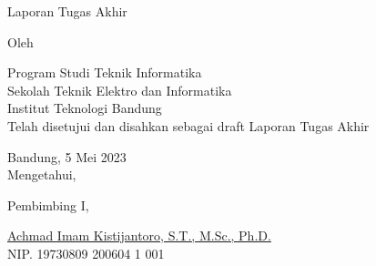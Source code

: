 \clearpage
\pagestyle{empty}

\begin{center}
    \smallskip

    \Large \bfseries \MakeUppercase{\thetitle}
    \vfill

    \Large Laporan Tugas Akhir
    \vfill

    \large Oleh

    \Large \theauthor

    \large Program Studi Teknik Informatika \\

    \normalsize \normalfont
    Sekolah Teknik Elektro dan Informatika \\
    Institut Teknologi Bandung \\

    \vfill
    \normalsize \normalfont
    Telah disetujui dan disahkan sebagai draft Laporan Tugas Akhir

    \vfill
    \normalsize \normalfont
    Bandung, 5 Mei 2023 \\
    Mengetahui,

    \vspace{0.5cm}
    Pembimbing I,

    \vfill
    \underline{Achmad Imam Kistijantoro, S.T., M.Sc., Ph.D.} \\
    NIP. 19730809 200604 1 001

\end{center}
\clearpage

